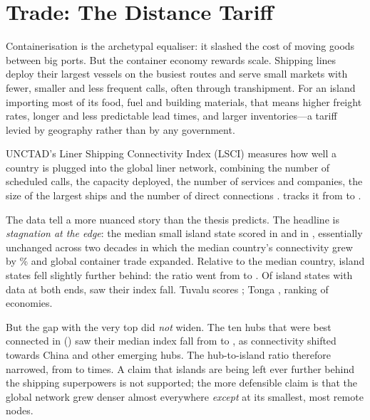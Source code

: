 \section{Trade: The Distance Tariff}
\label{sec:trade}

Containerisation is the archetypal equaliser: it slashed the cost of moving
goods between big ports. But the container economy rewards scale. Shipping
lines deploy their largest vessels on the busiest routes and serve small
markets with fewer, smaller and less frequent calls, often through
transhipment. For an island importing most of its food, fuel and building
materials, that means higher freight rates, longer and less predictable
lead times, and larger inventories---a tariff levied by geography rather than
by any government.

UNCTAD's Liner Shipping Connectivity Index (LSCI) measures how well a
country is plugged into the global liner network, combining the number of
scheduled calls, the capacity deployed, the number of services and companies,
the size of the largest ships and the number of direct connections \parencite{unctad2026lsci}.
 tracks it from \lsciFirstYear{} to \lsciLastYear.



The data tell a more nuanced story than the thesis predicts. The headline is
\emph{stagnation at the edge}: the median small island state scored
\sidsMedianLSCIfirst{} in \lsciFirstYear{} and \sidsMedianLSCI{} in
\lsciLastYear{}, essentially unchanged across two decades in which the
median country's connectivity grew by \allLSCIGrowthPct\% and global container
trade expanded. Relative to the median country, island states fell
slightly further behind: the ratio went from \allSidsRatioFirst{} to
\allSidsRatio. Of \nSIDSlsci{} island states with data at both ends,
\nSIDSlsciFell{} saw their index fall. Tuvalu scores \lsciTuvalu; Tonga
\lsciTonga, ranking \lsciTongaRank{} of \nLsci{} economies.

But the gap with the very top did \emph{not} widen. The ten hubs that were
best connected in \lsciFirstYear{} (\hubList) saw their median index fall
from \hubMedianLSCIfirst{} to \hubMedianLSCI{}, as connectivity shifted
towards China and other emerging hubs. The hub-to-island ratio therefore
narrowed, from \hubSidsRatioFirst{} to \hubSidsRatio{} times. A claim that
islands are being left ever further behind the shipping superpowers is not
supported; the more defensible claim is that the global network grew denser
almost everywhere \emph{except} at its smallest, most remote nodes.

